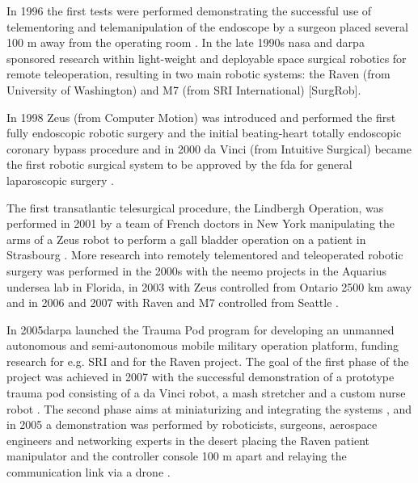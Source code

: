 In 1996 the first tests were performed demonstrating the successful use of telementoring and telemanipulation of the endoscope by a surgeon placed several 100 m away from the operating room \citep{bib:telesurg_history}. 
In the late 1990s \gls{nasa} and \gls{darpa} sponsored research within light-weight and deployable space surgical robotics for remote teleoperation, resulting in two main robotic systems: the Raven (from University of Washington) and M7 (from SRI International) [SurgRob].

In 1998 Zeus (from Computer Motion) was introduced and performed the first fully endoscopic robotic surgery and the initial beating-heart totally endoscopic coronary bypass procedure \citep{bib:brown_univ} and in 2000 da Vinci (from Intuitive Surgical) became the first robotic surgical system  to be approved by the \gls{fda} for general laparoscopic surgery \citep{bib:mddi}.

The first transatlantic telesurgical procedure, the Lindbergh Operation, was performed in 2001 by a team of French doctors in New York manipulating the arms of a Zeus robot to perform a gall bladder operation on a patient in Strasbourg \citep{bib:telesurg_history}. More research into remotely telementored and teleoperated robotic surgery was performed in the 2000s with the \gls{neemo} projects in the Aquarius undersea lab in Florida, in 2003 with Zeus controlled from Ontario 2500 km away \citep[pp 75, 81]{bib:surgical_book} and in 2006 and 2007 with Raven and M7 controlled from Seattle \citep[pp 28, 82]{bib:surgical_book}. 

In 2005\gls{darpa} launched the Trauma Pod program for developing an unmanned autonomous and semi-autonomous mobile military operation platform, funding research for e.g. SRI and for the Raven project. The goal of the first phase of the project was achieved in 2007 with the successful demonstration of a prototype trauma pod consisting of a da Vinci robot, a \gls{mash} stretcher and a custom nurse robot \citep[p 30]{bib:surgical_book}. The second phase aims at miniaturizing and integrating the systems \citep[p 31]{bib:surgical_book}, and in 2005 a demonstration was performed by roboticists, surgeons, aerospace engineers and networking experts in the desert placing the Raven patient manipulator and the controller console 100 m apart and relaying the communication link via a drone \citep{bib:docatadist}.

%
%

